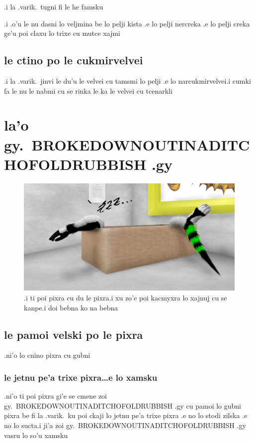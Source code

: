 \documentclass{report}
\begin{document}
.i la .varik.\ tugni fi le he famsku

.i .o'u le nu dasni lo veljmina be lo pelji kista .e lo pelji nercreka .e lo pelji creka ge'u poi claxu lo trixe cu mutce xajmi

\section{le ctino po le cukmirvelvei}
.i la .varik.\ jinvi le du'u le velvei cu tamsmi lo pelji .e lo narcukmirvelvei\@  .i cumki fa le nu le nabmi cu se rinka le ka le velvei cu tcenarkli

\chapter{la'o gy.\ BROKEDOWNOUTINADITCHOFOLDRUBBISH .gy}
\begin{figure}[ht]
	\centering
	\includegraphics[width=\textwidth]{brokedownoutinaditchofoldrubbish/brokedownoutinaditchofoldrubbish.png}
	\caption[center]{.i ti poi pixra cu du le pixra\@  .i xu zo'e poi kacmyxra lo xajnuj cu se kanpe\@  .i doi bebna ko na bebna}
\end{figure}
\section{le pamoi velski po le pixra}
.ni'o lo cnino pixra cu gubni

\subsection{le jetnu pe'a trixe pixra\ldots e lo xamsku}
.ni'o ti poi pixra gi'e se cmene zoi gy.\ BROKEDOWNOUTINADITCHOFOLDRUBBISH .gy cu pamoi lo gubni pixra be fi la .varik.\ ku poi ckaji lo jetnu pe'a trixe pixra .e no lo stodi zilska .e no lo sucta\@  .i ji'a zoi gy.\ BROKEDOWNOUTINADITCHOFOLDRUBBISH .gy vasru lo so'u xamsku
\end{document}
